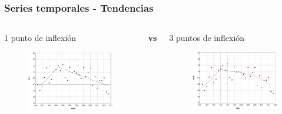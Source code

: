 \documentclass{beamer}
\begin{document}
\begin{frame}\frametitle{Series temporales - Tendencias}
	\begin{columns}
		\begin{column}{0.5\textwidth}
			\centering \normalsize 1 punto de inflexión
			\begin{figure}
				\includegraphics[width=\textwidth]{images/jpo1.png}
			\end{figure}
			
		\end{column}
		\large{\textbf{vs}}
		\begin{column}{0.5\textwidth}
			\centering \normalsize 3 puntos de inflexión
			\begin{figure}
				\centering
				\includegraphics[width=\textwidth]{images/jpo3.png}
			\end{figure}
		\end{column}
	\end{columns}


\end{frame}
\end{document}
